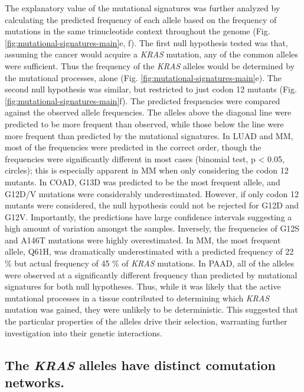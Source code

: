 \documentclass[english, 12pt, letterpaper]{article}
\newcommand{\KRAS}{\emph{KRAS}}
\begin{document}
The explanatory value of the mutational signatures was further analyzed by calculating the predicted frequency of each allele based on the frequency of mutations in the same trinucleotide context throughout the genome (Fig. \ref{fig:mutational-signatures-main}e, f).
The first null hypothesis tested was that, assuming the cancer would acquire a \KRAS{} mutation, any of the common alleles were sufficient. Thus the frequency of the \KRAS{} alleles would be determined by the mutational processes, alone (Fig. \ref{fig:mutational-signatures-main}e).
The second null hypothesis was similar, but restricted to just codon 12 mutants (Fig. \ref{fig:mutational-signatures-main}f).
The predicted frequencies were compared against the observed allele frequencies.
The alleles above the diagonal line were predicted to be more frequent than observed, while those below the line were more frequent than predicted by the mutational signatures.
In LUAD and MM, most of the frequencies were predicted in the correct order, though the frequencies were significantly different in most cases (binomial test, p < 0.05, circles); this is especially apparent in MM when only considering the codon 12 mutants.
In COAD, G13D was predicted to be the most frequent allele, and G12D/V mutations were considerably underestimated.
However, if only codon 12 mutants were considered, the null hypothesis could not be rejected for G12D and G12V.
Importantly, the predictions have large confidence intervals suggesting a high amount of variation amongst the samples.
Inversely, the frequencies of G12S and A146T mutations were highly overestimated.
In MM, the most frequent allele, Q61H, was dramatically underestimated with a predicted frequency of 22 \% but actual frequency of 45 \% of \KRAS{} mutations.
In PAAD, all of the alleles were observed at a significantly different frequency than predicted by mutational signatures for both null hypotheses.
Thus, while it was likely that the active mutational processes in a tissue contributed to determining which \KRAS{} mutation was gained, they were unlikely to be deterministic.
This suggested that the particular properties of the alleles drive their selection, warranting further investigation into their genetic interactions.


\subsection*{The \KRAS{} alleles have distinct comutation networks.}
\end{document}
